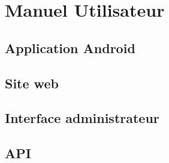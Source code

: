 \chapter{Manuel Utilisateur}

\section{Application Android}


\section{Site web}


\section{Interface administrateur}


\section{API}